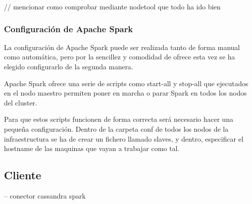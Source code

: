 // mencionar como comprobar mediante nodetool que todo ha ido bien


\subsubsection{Configuración de Apache Spark}


La configuración de Apache Spark puede ser realizada tanto de forma manual como automática, pero por la sencillez y comodidad de ofrece esta vez se ha elegido configurarlo de la segunda manera.

Apache Spark ofrece una serie de scripts como start-all y stop-all que ejecutados en el nodo maestro permiten poner en marcha o parar Spark en todos los nodos del cluster.

Para que estos scripts funcionen de forma correcta será necesario hacer una pequeña configuración. Dentro de la carpeta conf de todos los nodos de la infraestructura se ha de crear un fichero llamado slaves, y dentro, especificar el hostname de las maquinas que vayan a trabajar como tal.

\subsection{Cliente}

-- conector cassandra spark 
